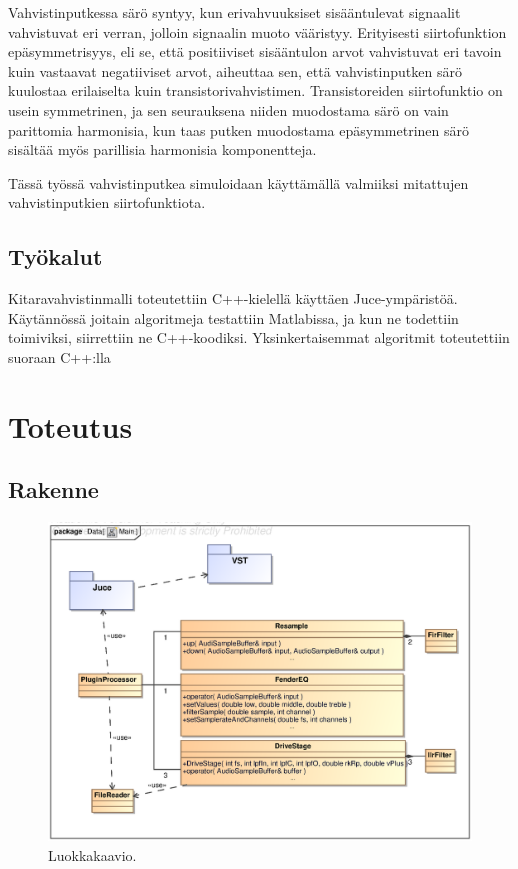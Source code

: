\documentclass[11pt, a4paper, oneside]{article}
\begin{document}
Vahvistinputkessa särö syntyy, kun erivahvuuksiset sisääntulevat signaalit vahvistuvat eri verran, jolloin signaalin muoto vääristyy.
Erityisesti siirtofunktion epäsymmetrisyys, eli se, että positiiviset sisääntulon arvot vahvistuvat eri tavoin kuin vastaavat negatiiviset arvot, aiheuttaa sen, että vahvistinputken särö kuulostaa erilaiselta kuin transistorivahvistimen. 
Transistoreiden siirtofunktio on usein symmetrinen, ja sen seurauksena niiden muodostama särö on vain parittomia harmonisia, kun taas putken muodostama epäsymmetrinen särö sisältää myös parillisia harmonisia komponentteja. \cite{dafx}

Tässä työssä vahvistinputkea simuloidaan käyttämällä valmiiksi mitattujen vahvistinputkien siirtofunktiota. 

\subsection{Työkalut}

Kitaravahvistinmalli toteutettiin C++-kielellä käyttäen Juce-ympäristöä.
Käytännössä joitain algoritmeja testattiin Matlabissa, ja kun ne todettiin toimiviksi, siirrettiin ne C++-koodiksi.
Yksinkertaisemmat algoritmit toteutettiin suoraan C++:lla



\section{Toteutus}
 
 \subsection{Rakenne}
  
  \begin{figure}[h!]
\includegraphics[width=1\textwidth, center]{ClassDiagram.eps} \newline
\caption{Luokkakaavio.}
\label{fig:ClassDiagram}
\end{figure}
  
\end{document}
